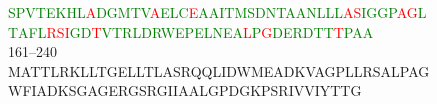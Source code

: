 \begin{figure}[H]
{\textcolor{green}{S}\textcolor{green}{P}\textcolor{green}{V}\textcolor{green}{T}\textcolor{green}{E}\textcolor{green}{K}\textcolor{green}{H}\textcolor{green}{L}\textcolor{red}{A}\textcolor{green}{D}\textcolor{green}{G}\textcolor{green}{M}\textcolor{green}{T}\textcolor{green}{V}\textcolor{red}{A}\textcolor{green}{E}\textcolor{green}{L}\textcolor{green}{C}\textcolor{red}{E}\textcolor{green}{A}\textcolor{green}{A}\textcolor{green}{I}\textcolor{green}{T}\textcolor{green}{M}\textcolor{green}{S}\textcolor{green}{D}\textcolor{green}{N}\textcolor{green}{T}\textcolor{green}{A}\textcolor{green}{A}\textcolor{green}{N}\textcolor{green}{L}\textcolor{green}{L}\textcolor{green}{L}\textcolor{red}{A}\textcolor{red}{S}\textcolor{green}{I}\textcolor{green}{G}\textcolor{green}{G}\textcolor{green}{P}\textcolor{red}{A}\textcolor{red}{G}\textcolor{green}{L}\textcolor{green}{T}\textcolor{green}{A}\textcolor{green}{F}\textcolor{green}{L}\textcolor{red}{R}\textcolor{red}{S}\textcolor{red}{I}\textcolor{green}{G}\textcolor{green}{D}\textcolor{red}{T}\textcolor{green}{V}\textcolor{green}{T}\textcolor{green}{R}\textcolor{green}{L}\textcolor{green}{D}\textcolor{green}{R}\textcolor{green}{W}\textcolor{green}{E}\textcolor{green}{P}\textcolor{green}{E}\textcolor{green}{L}\textcolor{green}{N}\textcolor{green}{E}\textcolor{green}{A}\textcolor{red}{L}\textcolor{green}{P}\textcolor{red}{G}\textcolor{green}{D}\textcolor{green}{E}\textcolor{green}{R}\textcolor{green}{D}\textcolor{green}{T}\textcolor{green}{T}\textcolor{red}{T}\textcolor{green}{P}\textcolor{green}{A}\textcolor{green}{A} \\
161--240 \\
MATTLRKLLTGELLTLASRQQLIDWMEADKVAGPLLRSALPAGWFIADKSGAGERGSRGIIAALGPDGKPSRIVVIYTTG \\
}
\end{figure}
